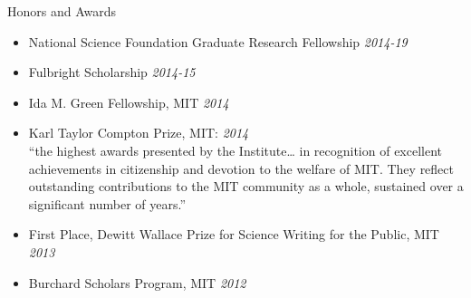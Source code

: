 \documentclass{resume} %
\begin{document}
\begin{rSection}{Honors and Awards}

\begin{itemize}
\item
National Science Foundation Graduate Research Fellowship \hfill {\em 2014-19}
\item
Fulbright Scholarship \hfill {\em 2014-15}
\item
Ida M. Green Fellowship, MIT \hfill {\em 2014} 
\item
  Karl Taylor Compton Prize, MIT: \hfill {\em 2014} \\
``the highest awards presented by the Institute\ldots
in recognition of excellent achievements in citizenship 
and devotion to the welfare of MIT. 
They reflect outstanding contributions to the MIT community as a whole, 
sustained over a significant number of years.'' 
\item
First Place, Dewitt Wallace Prize for Science Writing for the Public, 
MIT \hfill {\em 2013} 
\item
Burchard Scholars Program, MIT \hfill {\em 2012} \\
\end{itemize}

\end{rSection}

\end{document}
